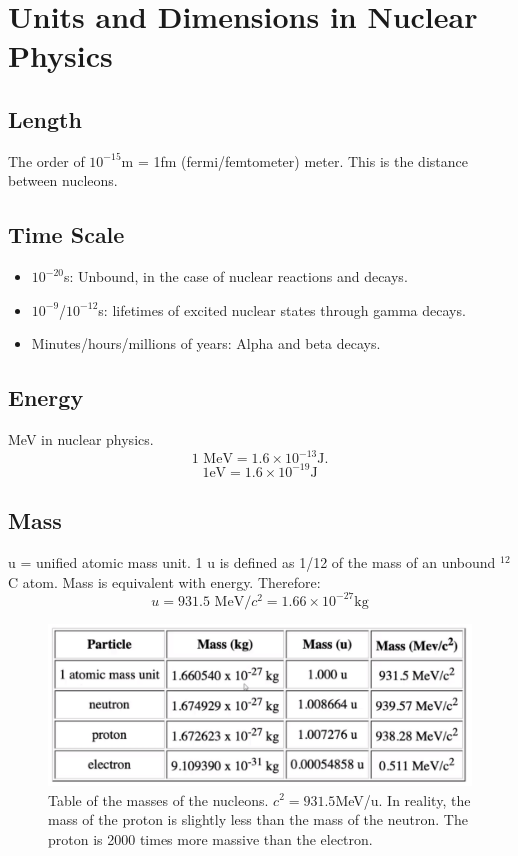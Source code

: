 \section{Units and Dimensions in Nuclear Physics}
\subsection{Length}
The order of $10^{-15}$m = 1fm (fermi/femtometer) meter. This is the distance between nucleons.

\subsection{Time Scale}
\begin{itemize}
    \item $10^{-20}$s: Unbound, in the case of nuclear reactions and decays. 
    \item $10^{-9}$/$10^{-12}$s: lifetimes of excited nuclear states through gamma decays. 
    \item Minutes/hours/millions of years: Alpha and beta decays. 
\end{itemize}

\subsection{Energy}
MeV in nuclear physics. 
\begin{equation}
    1 \text{ MeV} = 1.6 \times 10^{-13} \text{J}. 
    \end{equation}
    \begin{equation}
        1 \text{eV} = 1.6 \times 10^{-19} \text{J}
        \end{equation}

\subsection{Mass}
u = unified atomic mass unit. 1 u is defined as 1/12 of the mass of an unbound $^{12}$C atom. Mass is equivalent with energy. Therefore:
\begin{equation}
u = 931.5 \text{ MeV} / c^2 = 1.66 \times 10^{-27} \text{kg}
\end{equation}
\begin{figure}[ht!]
    \centering
    \includegraphics[width = \textwidth]{nucleon_mass_table.png}
    \caption{Table of the masses of the nucleons. $c^2 = 931.5$MeV/u. In reality, the mass of the proton is slightly less than the mass of the neutron. The proton is 2000 times more massive than the electron.}
    \label{fig: }
\end{figure}


